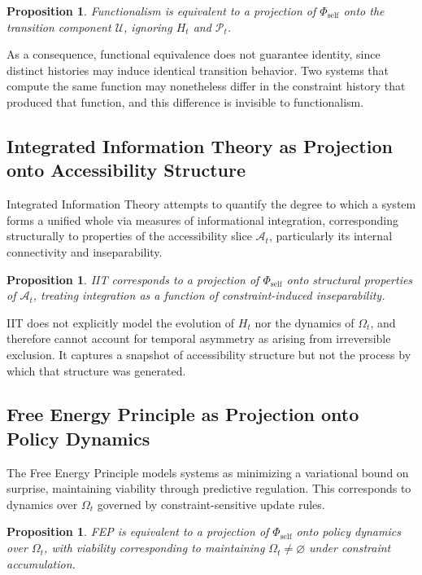 \documentclass[12pt, a4paper]{article}
\theoremstyle{plain}
\newtheorem{proposition}[theorem]{Proposition}
\theoremstyle{definition}
\theoremstyle{remark}
\begin{document}
\begin{proposition}
Functionalism is equivalent to a projection of $\Phi_{\mathrm{self}}$ onto the transition component $\mathcal{U}$, ignoring $H_t$ and $\mathcal{P}_t$.
\end{proposition}

As a consequence, functional equivalence does not guarantee identity, since distinct histories may induce identical transition behavior. Two systems that compute the same function may nonetheless differ in the constraint history that produced that function, and this difference is invisible to functionalism.

\subsection{Integrated Information Theory as Projection onto Accessibility Structure}

Integrated Information Theory attempts to quantify the degree to which a system forms a unified whole via measures of informational integration, corresponding structurally to properties of the accessibility slice $\mathcal{A}_t$, particularly its internal connectivity and inseparability.

\begin{proposition}
IIT corresponds to a projection of $\Phi_{\mathrm{self}}$ onto structural properties of $\mathcal{A}_t$, treating integration as a function of constraint-induced inseparability.
\end{proposition}

IIT does not explicitly model the evolution of $H_t$ nor the dynamics of $\Omega_t$, and therefore cannot account for temporal asymmetry as arising from irreversible exclusion. It captures a snapshot of accessibility structure but not the process by which that structure was generated.

\subsection{Free Energy Principle as Projection onto Policy Dynamics}

The Free Energy Principle models systems as minimizing a variational bound on surprise, maintaining viability through predictive regulation. This corresponds to dynamics over $\Omega_t$ governed by constraint-sensitive update rules.

\begin{proposition}
FEP is equivalent to a projection of $\Phi_{\mathrm{self}}$ onto policy dynamics over $\Omega_t$, with viability corresponding to maintaining $\Omega_t \neq \varnothing$ under constraint accumulation.
\end{proposition}
\end{document}
